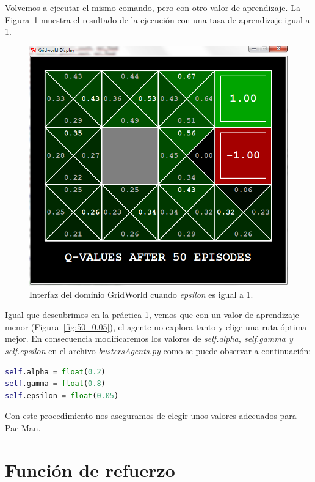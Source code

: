 \documentclass[11pt]{exam}
\begin{document}
Volvemos a ejecutar el mismo comando, pero con otro valor de aprendizaje. La Figura~\ref{fig:50_1} muestra el resultado de la ejecución con una tasa de aprendizaje igual a 1.

\begin{figure}[H]
	\centering
	\includegraphics[scale=0.5]{figures/50_1}
	\caption{Interfaz del dominio GridWorld cuando \textit{epsilon} es igual a 1.}
	\label{fig:50_1}
\end{figure}

Igual que descubrimos en la práctica 1, vemos que con un valor de aprendizaje menor (Figura~\ref{fig:50_0.05}), el agente no explora tanto y elige una ruta óptima mejor. En consecuencia modificaremos los valores de \textit{self.alpha, self.gamma y self.epsilon} en el archivo \textit{bustersAgents.py} como se puede observar a continuación:

\begin{lstlisting}[language=python, basicstyle=\footnotesize]
self.alpha = float(0.2)
self.gamma = float(0.8)
self.epsilon = float(0.05)
\end{lstlisting}

Con este procedimiento nos aseguramos de elegir unos valores adecuados para Pac-Man.

\section{Función de refuerzo}\label{refuerzo}
\end{document}
